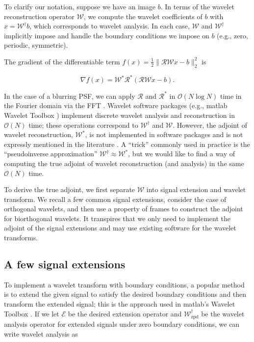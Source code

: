 \documentclass[journal]{IEEEtran}
\begin{document}
To clarify our notation, suppose we have an image $b$.  In terms of the wavelet reconstruction operator $\mathcal{W}$, we compute the wavelet coefficients of $b$ with $x=\mathcal{W}^\dagger b$, which corresponds to wavelet analysis.  In each case, $\mathcal{W}$ and $\mathcal{W}^\dagger$ implicitly impose and handle the boundary conditions we impose on $b$ (e.g., zero, periodic, symmetric).

The gradient of the differentiable term $f(x)={\frac{1}{2}\|\mathcal{RW}x-b\|_2^2}$ is

\[ \nabla f(x) = \mathcal{W}^\ast \mathcal{R}^\ast(\mathcal{RW}x-b). \] 

\noindent In the case of a blurring PSF, we can apply $\mathcal{R}$ and $\mathcal{R}^\ast$ in $\mathcal{O}(N\log N)$ time in the Fourier domain via the FFT \cite{beck_2009, hansen_2006}.  Wavelet software packages (e.g., {\sc matlab} Wavelet Toolbox \cite{matlab_wt_2015}) implement discrete wavelet analysis and reconstruction in $\mathcal{O}(N)$ time; these operations correspond to $\mathcal{W}^\dagger$ and $\mathcal{W}$.  However, the adjoint of wavelet reconstruction, $\mathcal{W}^\ast$, is not implemented in software packages and is not expressly mentioned in the literature \cite{mallat_2009, strang_1996}.  A ``trick'' commonly used in practice is the ``pseudoinverse approximation'' $\mathcal{W}^\dagger\approx\mathcal{W}^\ast$, but we would like to find a way of computing the true adjoint of wavelet reconstruction (and analysis) in the same $\mathcal{O}(N)$ time. 


To derive the true adjoint, we first separate $\mathcal{W}$ into signal extension and wavelet transform.  We recall a few common signal extensions, consider the case of orthogonal wavelets, and then use a property of frames to construct the adjoint for biorthogonal wavelets.  It transpires that we only need to implement the adjoint of the signal extensions and may use existing software for the wavelet transforms.

\subsection{A few signal extensions}
To implement a wavelet transform with boundary conditions, a popular method is to extend the given signal to satisfy the desired boundary conditions and then transform the extended signal; this is the approach used in {\sc matlab}'s Wavelet Toolbox \cite{matlab_wt_2015}.  If we let $\mathcal{E}$ be the desired extension operator and $\mathcal{W}^\dagger_\text{zpd}$ be the wavelet analysis operator for extended signals under zero boundary conditions, we can write wavelet analysis as 
\end{document}
